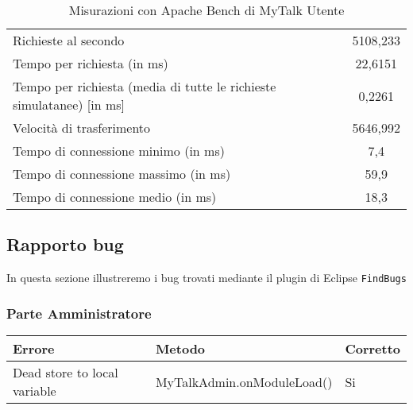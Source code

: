 {{{\begin{table}[h!]
\begin{center}
\begin{tabular}{l c}
					Richieste al secondo & 5108,233\\
					
					Tempo per richiesta (in ms) & 22,6151\\
					
					Tempo per richiesta (media di tutte le richieste simulatanee) [in ms] & 0,2261\\
					
					Velocità di trasferimento & 5646,992\\
					
					Tempo di connessione minimo (in ms) & 7,4\\
					
					Tempo di connessione massimo (in ms) & 59,9\\
					
					Tempo di connessione medio (in ms) & 18,3\\

					\bottomrule
					\end{tabular}
			
		\end{center}	
		\caption{Misurazioni con Apache Bench di MyTalk Utente} 
	\end{table}
	
	\newpage
	\subsection{Rapporto bug}{
In questa sezione illustreremo i bug trovati mediante il plugin di Eclipse \texttt{FindBugs}
\subsubsection{Parte Amministratore}
	\begin{longtable}{p{} p{} p{} }
\rowcolors{2}{light}{}
\textbf{Errore} & \textbf{Metodo} & \textbf{Corretto} \\
\midrule
					Dead store to local variable & MyTalkAdmin.onModuleLoad() & Si\\
					\midrule
					

\end{longtable}}}}}
